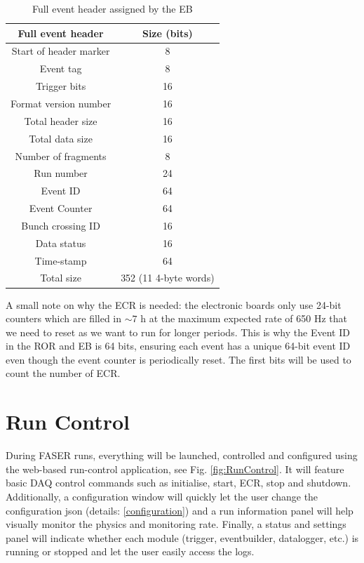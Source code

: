 \begin{table}[htbp!] 
\caption{Full event header assigned by the EB}
\centering
\label{table:FullEventHeader}
\begin{tabular}{c c}
\toprule
Full event header & Size (bits) \\
\midrule
Start of header marker & 8\\
Event tag & 8\\
Trigger bits & 16\\
Format version number & 16\\
Total header size & 16\\
Total data size & 16\\
Number of fragments & 8\\
Run number & 24\\
Event ID & 64\\
Event Counter & 64\\
Bunch crossing ID & 16\\
Data status & 16\\
Time-stamp & 64\\
\midrule
Total size & 352 (11 4-byte words)\\
\bottomrule
\end{tabular}
\end{table}

A small note on why the ECR is needed: the electronic boards only use 24-bit counters which are filled in $\sim7$ h at the maximum expected rate of 650 Hz that we need to reset as we want to run for longer periods. This is why the Event ID in the ROR and EB is 64 bits, ensuring each event has a unique 64-bit event ID even though the event counter is periodically reset. The first bits will be used to count the number of ECR.

\section{Run Control}

During FASER runs, everything will be launched, controlled and configured using the web-based run-control application, see Fig. \ref{fig:RunControl}. It will feature basic DAQ control commands such as initialise, start, ECR, stop and shutdown. Additionally, a configuration window will quickly let the user change the configuration json (details: \ref{configuration}) and a run information panel will help visually monitor the physics and monitoring rate. Finally, a status and settings panel will indicate whether each module (trigger, eventbuilder, datalogger, etc.) is running or stopped and let the user easily access the logs.

